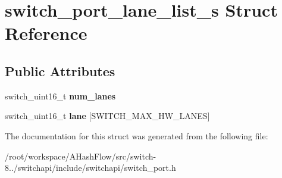 \hypertarget{structswitch__port__lane__list__s}{\section{switch\+\_\+port\+\_\+lane\+\_\+list\+\_\+s Struct Reference}
\label{structswitch__port__lane__list__s}
}
\subsection*{Public Attributes}
\begin{DoxyCompactItemize}
\item 
\hypertarget{structswitch__port__lane__list__s_a88f996f816fa538b40acb658636df609}{switch\+\_\+uint16\+\_\+t {\bfseries num\+\_\+lanes}}\label{structswitch__port__lane__list__s_a88f996f816fa538b40acb658636df609}

\item 
\hypertarget{structswitch__port__lane__list__s_ab55172eff11b45f772df1a918721c178}{switch\+\_\+uint16\+\_\+t {\bfseries lane} \mbox{[}S\+W\+I\+T\+C\+H\+\_\+\+M\+A\+X\+\_\+\+H\+W\+\_\+\+L\+A\+N\+E\+S\mbox{]}}\label{structswitch__port__lane__list__s_ab55172eff11b45f772df1a918721c178}

\end{DoxyCompactItemize}


The documentation for this struct was generated from the following file\+:\begin{DoxyCompactItemize}
\item 
/root/workspace/\+A\+Hash\+Flow/src/switch-\/8../switchapi/include/switchapi/switch\+\_\+port.\+h\end{DoxyCompactItemize}
